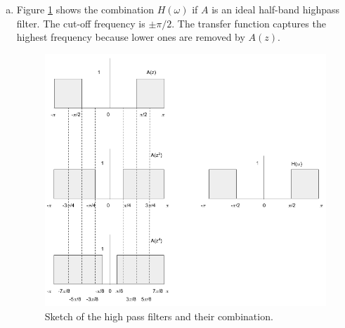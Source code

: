 \begin{enumerate}[(a)]
\item Figure \ref{fig:p7-3} shows the combination $H(\omega)$ if $A$ is an ideal half-band highpass filter. The cut-off frequency is $\pm \pi/2$. The transfer function captures the highest frequency because lower ones are removed by $A(z)$.
\begin{figure}[htbp]
	\centering
	\includegraphics[width=\textwidth]{images/p7-3}
	\caption{Sketch of the high pass filters and their combination.}
	\label{fig:p7-3}
\end{figure}
\end{enumerate}